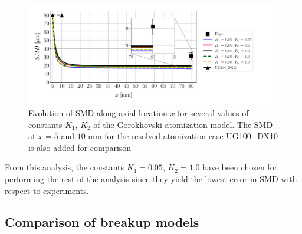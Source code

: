 \begin{figure}[h!]
\centering
\includegraphics[scale=0.5]{./part2_developments/figures_ch6_lagrangian_JICF/apte_model_calibration_u_vw_lognorm/SMD_vs_x_apte_calibration_comparison}
\caption[Evolution of SMD along axial location $x$ for several values of the Gorokhovski atomization model]{Evolution of SMD along axial location $x$ for several values of constants $K_1$, $K_2$ of the Gorokhovski atomization model. The SMD at $x = 5$ and $10$ mm for the resolved atomization case UG100\_DX10 is also added for comparison}
\label{fig:SMD_vs_x_param_breakup_model}
\end{figure}







From this analysis, the constants $K_1 = 0.05$, $K_2 = 1.0$ have been chosen for performing the rest of the analysis since they yield the lowest error in SMD with respect to experiments. 

\subsection{Comparison of breakup models}

